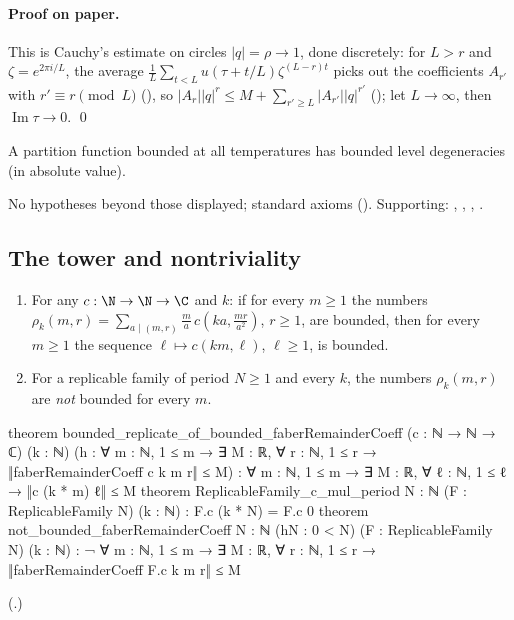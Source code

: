\paragraph{Proof on paper.}  This is Cauchy's estimate on circles $|q|=\rho\to1$, done discretely: for $L>r$ and
$\zeta=e^{2\pi i/L}$, the average $\frac1L\sum_{t<L}u(\tau+t/L)\zeta^{(L-r)t}$ picks out the coefficients $A_{r'}$ with $r'\equiv r\pmod L$
(), so $|A_r||q|^r\le M+\sum_{r'\ge L}|A_{r'}||q|^{r'}$ (); let $L\to\infty$,
then $\operatorname{Im}\tau\to0$. \qed
\begin{physics}A partition function bounded at all temperatures has bounded level degeneracies (in absolute value).\end{physics}
\begin{status}No hypotheses beyond those displayed; standard axioms ().
Supporting: , , ,
.\end{status}

\subsection{The tower and nontriviality}

\begin{theorem}\label{ch19:thm:tower}
\begin{enumerate}[label=(\alph*)]
\item For any $c:\N\to\N\to\C$ and $k$: if for every $m\ge1$ the numbers $\rho_{k}(m,r)=\sum_{a\mid(m,r)}\frac ma\,c(ka,\frac{mr}{a^2})$,
  $r\ge1$, are bounded, then for every $m\ge1$ the sequence $\ell\mapsto c(km,\ell)$, $\ell\ge1$, is bounded.
\item For a replicable family of period $N\ge1$ and every $k$, the numbers $\rho_k(m,r)$ are \emph{not} bounded for every $m$.
\end{enumerate}
\end{theorem}
\begin{leancode}
theorem bounded_replicate_of_bounded_faberRemainderCoeff (c : ℕ → ℕ → ℂ) (k : ℕ)
    (h : ∀ m : ℕ, 1 ≤ m → ∃ M : ℝ, ∀ r : ℕ, 1 ≤ r → ‖faberRemainderCoeff c k m r‖ ≤ M) :
    ∀ m : ℕ, 1 ≤ m → ∃ M : ℝ, ∀ ℓ : ℕ, 1 ≤ ℓ → ‖c (k * m) ℓ‖ ≤ M
theorem ReplicableFamily_c_mul_period {N : ℕ} (F : ReplicableFamily N) (k : ℕ) :
    F.c (k * N) = F.c 0
theorem not_bounded_faberRemainderCoeff {N : ℕ} (hN : 0 < N) (F : ReplicableFamily N) (k : ℕ) :
    ¬ ∀ m : ℕ, 1 ≤ m → ∃ M : ℝ, ∀ r : ℕ, 1 ≤ r → ‖faberRemainderCoeff F.c k m r‖ ≤ M
\end{leancode}
(.)
